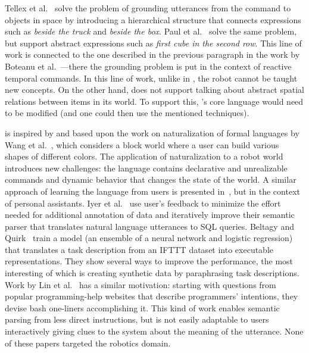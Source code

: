 Tellex et al.~\cite{tellexGrounding} solve the problem of grounding utterances
from the command to objects in space by introducing a hierarchical structure
that connects expressions such as \emph{beside the truck} and \emph{beside the
box}. Paul et al.~\cite{paulGrounding} solve the same problem, but support
abstract expressions such as \emph{first cube in the second row}. This line of
work is connected to the one described in the previous paragraph in the work by
Boteanu et al.~\cite{boteanuVerifiableGrounding}---there the grounding
problem is put in the context of reactive temporal commands. In this line of
work, unlike in \tool, the robot cannot be taught new concepts. On the other hand,
\tool does not support talking about abstract spatial relations between items
in its world. To support this, \tool's core language would need to be modified
(and one could then use the mentioned techniques).

\tool is inspired by and based upon the work on naturalization of formal
languages by Wang et al.~\cite{wangVoxelurn}, which considers
a block world where a user can build various shapes of different
colors. The application of naturalization to a robot world introduces new
challenges: the language contains declarative and unrealizable
commands and dynamic behavior that changes the state of the world.
A similar approach of learning the language from users is presented in~\cite{azariaLia}, but in the context of personal
assistants. 
Iyer et al.~\cite{iyerLearningNeuralSemanticParser} use user's feedback to 
minimize the effort needed for additional annotation of data and iteratively improve their semantic parser 
that translates natural language utterances to SQL queries. 
Beltagy and Quirk~\cite{beltagyIFTT} train a model (an ensemble of a neural network and logistic
regression) that translates a task description from an IFTTT dataset into
executable representations. They show several ways to improve the performance, the
most interesting of which is creating synthetic data by paraphrasing task
descriptions. Work by Lin et al.~\cite{linTelina} has a similar motivation:
starting with questions from popular programming-help websites that describe
programmers' intentions, they devise bash one-liners accomplishing it. 
This kind of work enables semantic parsing from 
less direct instructions, but is not easily adaptable to users interactively giving clues to the 
system about the meaning of the utterance.
None of these papers targeted the robotics domain.

